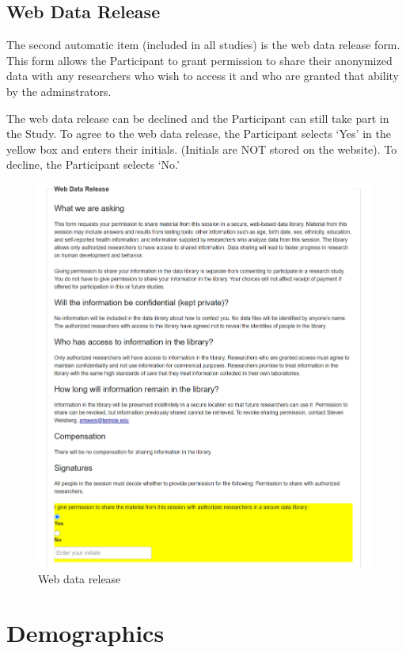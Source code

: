 \documentclass[
  12pt,
]{book}
\begin{document}
\hypertarget{web-data-release}{%
\subsection{Web Data Release}\label{web-data-release}}

The second automatic item (included in all studies) is the web data release form. This form allows the Participant to grant permission to share their anonymized data with any researchers who wish to access it and who are granted that ability by the adminstrators.

The web data release can be declined and the Participant can still take part in the Study. To agree to the web data release, the Participant selects `Yes' in the yellow box and enters their initials. (Initials are NOT stored on the website). To decline, the Participant selects `No.'

\begin{figure}
\centering
\includegraphics{./figs/Intro_Page_2.png}
\caption{Web data release}
\end{figure}

\hypertarget{demographics}{%
\section{Demographics}\label{demographics}}
\end{document}
